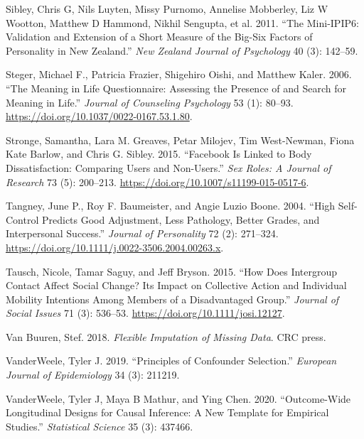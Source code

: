 \documentclass[
  singlecolumn]{report}
\newlength{\cslhangindent}
\newlength{\cslentryspacingunit} %
\newenvironment{CSLReferences}[2] %
 {%
  \setlength{\parindent}{0pt}
  \ifodd #1
  \let\oldpar\par
  \def\par{\hangindent=\cslhangindent\oldpar}
  \fi
  \setlength{\parskip}{#2\cslentryspacingunit}
 }%
 {}
\begin{document}
\begin{CSLReferences}{1}{0}
\leavevmode{}%
Sibley, Chris G, Nils Luyten, Missy Purnomo, Annelise Mobberley, Liz W
Wootton, Matthew D Hammond, Nikhil Sengupta, et al. 2011. {``The
Mini-IPIP6: Validation and Extension of a Short Measure of the Big-Six
Factors of Personality in New Zealand.''} \emph{New Zealand Journal of
Psychology} 40 (3): 142--59.

\leavevmode{}%
Steger, Michael F., Patricia Frazier, Shigehiro Oishi, and Matthew
Kaler. 2006. {``The Meaning in Life Questionnaire: Assessing the
Presence of and Search for Meaning in Life.''} \emph{Journal of
Counseling Psychology} 53 (1): 80--93.
\url{https://doi.org/10.1037/0022-0167.53.1.80}.

\leavevmode{}%
Stronge, Samantha, Lara M. Greaves, Petar Milojev, Tim West-Newman,
Fiona Kate Barlow, and Chris G. Sibley. 2015. {``Facebook Is Linked to
Body Dissatisfaction: Comparing Users and Non-Users.''} \emph{Sex Roles:
A Journal of Research} 73 (5): 200--213.
\url{https://doi.org/10.1007/s11199-015-0517-6}.

\leavevmode{}%
Tangney, June P., Roy F. Baumeister, and Angie Luzio Boone. 2004.
{``High Self-Control Predicts Good Adjustment, Less Pathology, Better
Grades, and Interpersonal Success.''} \emph{Journal of Personality} 72
(2): 271--324. \url{https://doi.org/10.1111/j.0022-3506.2004.00263.x}.

\leavevmode{}%
Tausch, Nicole, Tamar Saguy, and Jeff Bryson. 2015. {``How Does
Intergroup Contact Affect Social Change? Its Impact on Collective Action
and Individual Mobility Intentions Among Members of a Disadvantaged
Group.''} \emph{Journal of Social Issues} 71 (3): 536--53.
\url{https://doi.org/10.1111/josi.12127}.

\leavevmode{}%
Van Buuren, Stef. 2018. \emph{Flexible Imputation of Missing Data}. CRC
press.

\leavevmode{}%
VanderWeele, Tyler J. 2019. {``Principles of Confounder Selection.''}
\emph{European Journal of Epidemiology} 34 (3): 211219.

\leavevmode{}%
VanderWeele, Tyler J, Maya B Mathur, and Ying Chen. 2020.
{``Outcome-Wide Longitudinal Designs for Causal Inference: A New
Template for Empirical Studies.''} \emph{Statistical Science} 35 (3):
437466.


\end{CSLReferences}
\end{document}
